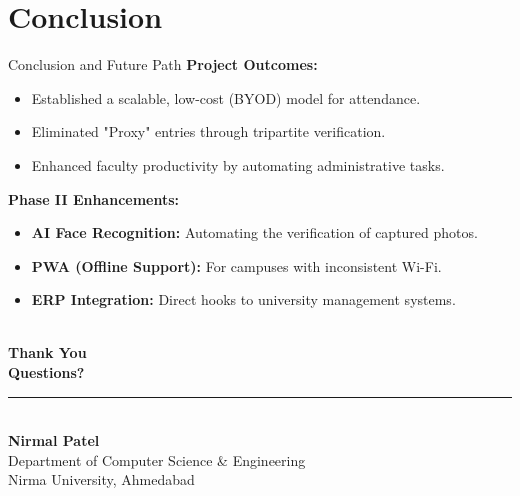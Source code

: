 \documentclass[10pt, aspectratio=169]{beamer}
\begin{document}
\section{Conclusion}
\begin{frame}{Conclusion and Future Path}
    \textbf{Project Outcomes:}
    \begin{itemize}
        \item Established a scalable, low-cost (BYOD) model for attendance.
        \item Eliminated "Proxy" entries through tripartite verification.
        \item Enhanced faculty productivity by automating administrative tasks.
    \end{itemize}
    \vspace{0.4cm}
    \textbf{Phase II Enhancements:}
    \begin{itemize}
        \item \textbf{AI Face Recognition:} Automating the verification of captured photos.
        \item \textbf{PWA (Offline Support):} For campuses with inconsistent Wi-Fi.
        \item \textbf{ERP Integration:} Direct hooks to university management systems.
    \end{itemize}
\end{frame}

\begin{frame}[plain]
    \begin{center}
        \vspace{1cm}
        \Huge \textcolor{nirmablue}{\faCheckCircle} \\
        \vspace{0.5cm}
        {\Huge \textcolor{nirmablue}{\textbf{Thank You}}} \\
        \vspace{0.3cm}
        {\Large \textbf{Questions?}} \\
        \vfill
        \textcolor{nirmagold}{\rule{0.2\textwidth}{2pt}} \\
        \vspace{0.3cm}
        \textbf{Nirmal Patel} \\
        \vspace{0.1cm}
        {\scriptsize Department of Computer Science \& Engineering \\ Nirma University, Ahmedabad}
    \end{center}
\end{frame}
\end{document}

